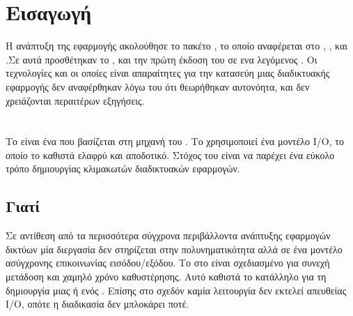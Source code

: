 \section{Εισαγωγή}
\pSpace Η ανάπτυξη της εφαρμογής ακολούθησε το πακέτο , το οποίο αναφέρεται στο , ,  και .Σε αυτά προσθέτηκαν το ,  και την πρώτη έκδοση του  σε ενα  λεγόμενος . Οι τεχνολογίες  και  οι οποίες είναι απαραίτητες για την κατασεύη μιας διαδικτυακής εφαρμογής δεν αναφέρθηκαν λόγω του ότι θεωρήθηκαν αυτονόητα, και δεν χρειάζονται περαιτέρων εξηγήσεις.

\section{}
\pSpace Το  είναι ένα  που βασίζεται στη μηχανή  του . Το  χρησιμοποιεί ένα  μοντέλο I/O, το οποίο το καθιστά ελαφρύ και αποδοτικό. Στόχος του  είναι να παρέχει ένα εύκολο τρόπο δημιουργίας κλιμακωτών διαδικτυακών εφαρμογών. 

\subsection*{Γιατί}
\pSpace Σε αντίθεση από τα περισσότερα σύγχρονα περιβάλλοντα ανάπτυξης εφαρμογών δικτύων μία διεργασία  δεν στηρίζεται στην πολυνηματικότητα αλλά σε ένα μοντέλο ασύγχρονης επικοινωνίας εισόδου/εξόδου. Το  στο  είναι σχεδιασμένο για συνεχή μετάδοση και χαμηλό χρόνο καθυστέρησης. Αυτό καθιστά το  κατάλληλο για τη δημιουργία μιας  ή ενός . Επίσης στο  σχεδόν καμία λειτουργία δεν εκτελεί απευθείας I/O, οπότε η διαδικασία δεν μπλοκάρει ποτέ.

